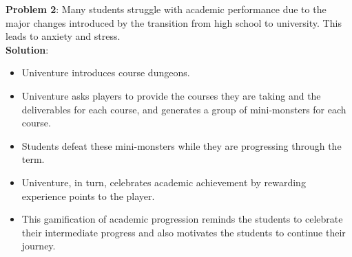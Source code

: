 \documentclass[landscape,archE,fontscale=0.29]{baposter} %
\newcommand{\compresslist}{ %
\setlength{\itemsep}{1pt}
\setlength{\parskip}{0pt}
\setlength{\parsep}{0pt}
}
\newcommand{\myv}{\vspace{-1mm}}
\begin{document}
\begin{poster}
{  \begin{minipage}{0.72\linewidth}
    \vspace{2.5mm}
    \textbf{Problem 2}: Many students struggle with academic performance due to the major changes introduced by the transition from high school to university. This leads to anxiety and stress.
    \\
    \textbf{Solution}:
    \myv \myv
    \begin{itemize} \compresslist
    \item Univenture introduces course dungeons.
    \item Univenture asks players to provide the courses they are taking and the deliverables for each course, and generates a group of mini-monsters for each course.
    \item Students defeat these mini-monsters while they are progressing through the term.
    \item Univenture, in turn, celebrates academic achievement by rewarding experience points to the player.
    \item This gamification of academic progression  reminds the students to celebrate their intermediate progress and also motivates the students to continue their journey.
    \end{itemize}
  \end{minipage}
  \begin{minipage}{0.26\linewidth}
    \begin{center}

\end{center}
\end{minipage}}
\end{poster}
\end{document}
